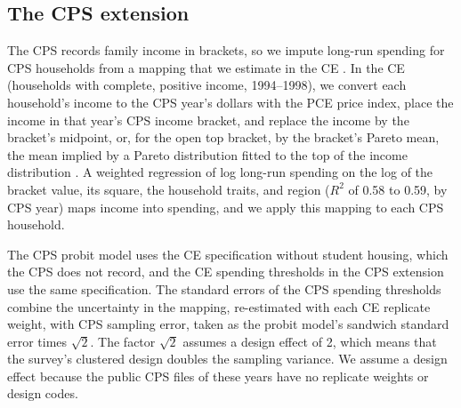\documentclass[11pt]{article}
\begin{document}
\subsection{The CPS extension}
\label{app:cpsmethod}

The CPS records family income in brackets, so we impute long-run spending for CPS households from a mapping that we estimate in the CE \citep{skinner1987,blundell2008}. In the CE (households with complete, positive income, 1994--1998), we convert each household's income to the CPS year's dollars with the PCE price index, place the income in that year's CPS income bracket, and replace the income by the bracket's midpoint, or, for the open top bracket, by the bracket's Pareto mean, the mean implied by a Pareto distribution fitted to the top of the income distribution \citep{parker1983}. A weighted regression of log long-run spending on the log of the bracket value, its square, the household traits, and region ($R^2$ of 0.58 to 0.59, by CPS year) maps income into spending, and we apply this mapping to each CPS household.

The CPS probit model uses the CE specification without student housing, which the CPS does not record, and the CE spending thresholds in the CPS extension use the same specification. The standard errors of the CPS spending thresholds combine the uncertainty in the mapping, re-estimated with each CE replicate weight, with CPS sampling error, taken as the probit model's sandwich standard error times $\sqrt{2}$. The factor $\sqrt{2}$ assumes a design effect of 2, which means that the survey's clustered design doubles the sampling variance. We assume a design effect because the public CPS files of these years have no replicate weights or design codes.
\end{document}
